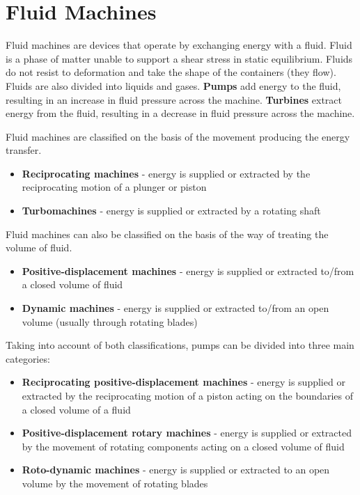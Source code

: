 \documentclass[class=report, crop=false, 12pt,a4paper]{standalone}
\begin{document}
\section{Fluid Machines}
Fluid machines are devices that operate by exchanging energy with a fluid. Fluid is a phase of matter unable to support a shear stress in static equilibrium. Fluids do not resist to deformation and take the shape of the containers (they flow). Fluids are also divided into liquids and gases. \textbf{Pumps} add energy to the fluid, resulting in an increase in fluid pressure across the machine. \textbf{Turbines} extract energy from the fluid, resulting in a decrease in fluid pressure across the machine.

Fluid machines are classified on the basis of the movement producing the energy transfer.
\begin{itemize}
  \item \textbf{Reciprocating machines} - energy is supplied or extracted by the reciprocating motion of a plunger or piston
  \item \textbf{Turbomachines} - energy is supplied or extracted by a rotating shaft
\end{itemize}
Fluid machines can also be classified on the basis of the way of treating the volume of fluid.
\begin{itemize}
  \item \textbf{Positive-displacement machines} - energy is supplied or extracted to/from a closed volume of fluid
  \item \textbf{Dynamic machines} - energy is supplied or extracted to/from an open volume (usually through rotating blades)
\end{itemize}
Taking into account of both classifications, pumps can be divided into three main categories:
\begin{itemize}
  \item \textbf{Reciprocating positive-displacement machines} - energy is supplied or extracted by the reciprocating motion of a piston acting on the boundaries of a closed volume of a fluid
  \item \textbf{Positive-displacement rotary machines} - energy is supplied or extracted by the movement of rotating components acting on a closed volume of fluid
  \item \textbf{Roto-dynamic machines} - energy is supplied or extracted to an open volume by the movement of rotating blades
\end{itemize}
\end{document}
